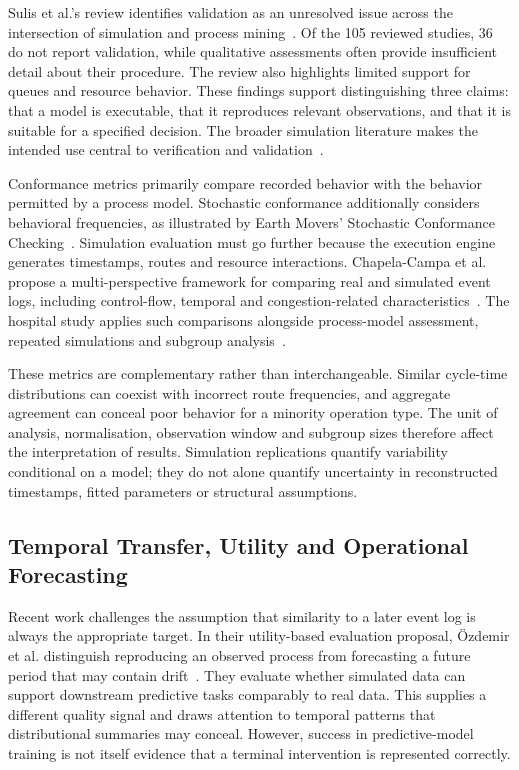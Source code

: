 Sulis et al.'s review identifies validation as an unresolved issue across the intersection of simulation and process mining~\cite{Sulis2026SimulationReview}. Of the 105 reviewed studies, 36 do not report validation, while qualitative assessments often provide insufficient detail about their procedure. The review also highlights limited support for queues and resource behavior. These findings support distinguishing three claims: that a model is executable, that it reproduces relevant observations, and that it is suitable for a specified decision. The broader simulation literature makes the intended use central to verification and validation~\cite{Sargent2013Validation,Aalst2015}.

Conformance metrics primarily compare recorded behavior with the behavior permitted by a process model. Stochastic conformance additionally considers behavioral frequencies, as illustrated by Earth Movers' Stochastic Conformance Checking~\cite{leeman2013EarthMovers}. Simulation evaluation must go further because the execution engine generates timestamps, routes and resource interactions. Chapela-Campa et al. propose a multi-perspective framework for comparing real and simulated event logs, including control-flow, temporal and congestion-related characteristics~\cite{Chapela2025SimQuality}. The hospital study applies such comparisons alongside process-model assessment, repeated simulations and subgroup analysis~\cite{Hospital2026Vinci}.

These metrics are complementary rather than interchangeable. Similar cycle-time distributions can coexist with incorrect route frequencies, and aggregate agreement can conceal poor behavior for a minority operation type. The unit of analysis, normalisation, observation window and subgroup sizes therefore affect the interpretation of results. Simulation replications quantify variability conditional on a model; they do not alone quantify uncertainty in reconstructed timestamps, fitted parameters or structural assumptions.

\subsection{Temporal Transfer, Utility and Operational Forecasting}

Recent work challenges the assumption that similarity to a later event log is always the appropriate target. In their utility-based evaluation proposal, \"Ozdemir et al. distinguish reproducing an observed process from forecasting a future period that may contain drift~\cite{Ozdemir2025UtilityBPS}. They evaluate whether simulated data can support downstream predictive tasks comparably to real data. This supplies a different quality signal and draws attention to temporal patterns that distributional summaries may conceal. However, success in predictive-model training is not itself evidence that a terminal intervention is represented correctly.

